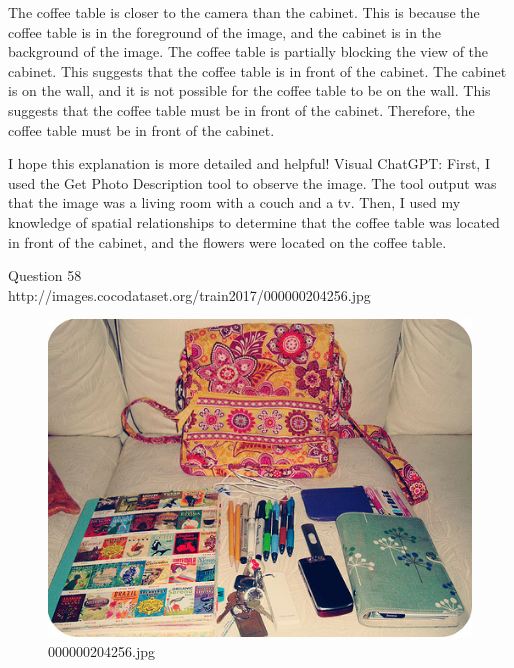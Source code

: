 \begin{enumerate}
    The coffee table is closer to the camera than the cabinet. This is because the coffee table is in the foreground of the image, and the cabinet is in the background of the image.
    The coffee table is partially blocking the view of the cabinet. This suggests that the coffee table is in front of the cabinet.
    The cabinet is on the wall, and it is not possible for the coffee table to be on the wall. This suggests that the coffee table must be in front of the cabinet.
    Therefore, the coffee table must be in front of the cabinet.
    
    I hope this explanation is more detailed and helpful! 
    \subitem Visual ChatGPT: First, I used the Get Photo Description tool to observe the image. The tool output was that the image was a living room with a couch and a tv. Then, I used my knowledge of spatial relationships to determine that the coffee table was located in front of the cabinet, and the flowers were located on the coffee table.
\end{enumerate}
Question 58\\
http://images.cocodataset.org/train2017/000000204256.jpg
\begin{figure}[h]
    \centering
    \includegraphics[width=0.8\linewidth]{../image set/hard/000000204256.jpg}
    \caption{000000204256.jpg}
\end{figure}
